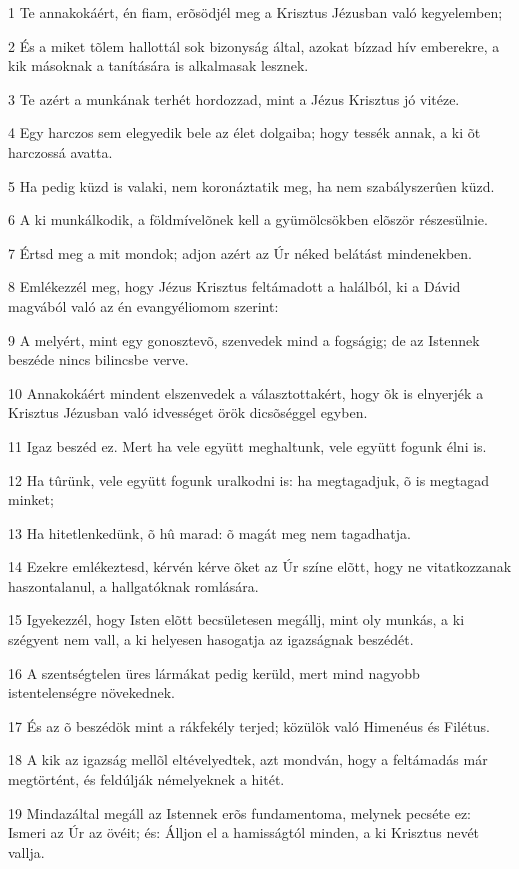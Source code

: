 \par 1 Te annakokáért, én fiam, erõsödjél meg a Krisztus Jézusban való kegyelemben;
\par 2 És a miket tõlem hallottál sok bizonyság által, azokat bízzad hív emberekre, a kik másoknak a tanítására is alkalmasak lesznek.
\par 3 Te azért a munkának terhét hordozzad, mint a Jézus Krisztus jó vitéze.
\par 4 Egy harczos sem elegyedik bele az élet dolgaiba; hogy tessék annak, a ki õt harczossá avatta.
\par 5 Ha pedig küzd is valaki, nem koronáztatik meg, ha nem szabályszerûen küzd.
\par 6 A ki munkálkodik, a földmívelõnek kell a gyümölcsökben elõször részesülnie.
\par 7 Értsd meg a mit mondok; adjon azért az Úr néked belátást mindenekben.
\par 8 Emlékezzél meg, hogy Jézus Krisztus feltámadott a halálból, ki a Dávid magvából való az én evangyéliomom szerint:
\par 9 A melyért, mint egy gonosztevõ, szenvedek mind a fogságig; de az Istennek beszéde nincs bilincsbe verve.
\par 10 Annakokáért mindent elszenvedek a választottakért, hogy õk is elnyerjék a Krisztus Jézusban való idvességet örök dicsõséggel egyben.
\par 11 Igaz beszéd ez. Mert ha vele együtt meghaltunk, vele együtt fogunk élni is.
\par 12 Ha tûrünk, vele együtt fogunk uralkodni is: ha megtagadjuk, õ is megtagad minket;
\par 13 Ha hitetlenkedünk, õ hû marad: õ magát meg nem tagadhatja.
\par 14 Ezekre emlékeztesd, kérvén kérve õket az Úr színe elõtt, hogy ne vitatkozzanak haszontalanul, a hallgatóknak romlására.
\par 15 Igyekezzél, hogy Isten elõtt becsületesen megállj, mint oly munkás, a ki szégyent nem vall, a ki helyesen hasogatja az igazságnak beszédét.
\par 16 A szentségtelen üres lármákat pedig kerüld, mert mind nagyobb istentelenségre növekednek.
\par 17 És az õ beszédök mint a rákfekély terjed; közülök való Himenéus és Filétus.
\par 18 A kik az igazság mellõl eltévelyedtek, azt mondván, hogy a feltámadás már megtörtént, és feldúlják némelyeknek a hitét.
\par 19 Mindazáltal megáll az Istennek erõs fundamentoma, melynek pecséte ez: Ismeri az Úr az övéit; és: Álljon el a hamisságtól minden, a ki Krisztus nevét vallja.
